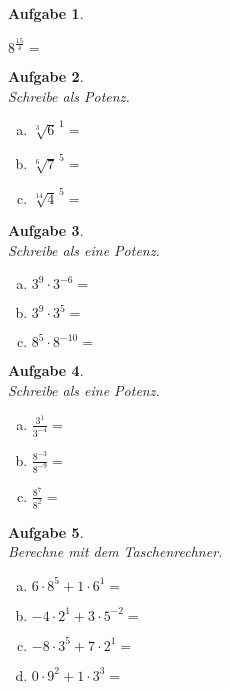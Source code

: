 \documentclass[12pt,fleqn]{article}
\theoremstyle{aufg}
\newtheorem{aufgabe}{Aufgabe}
\theoremstyle{bsp}
\begin{document}
\begin{flushleft}
\begin{aufgabe}
\begin{multicols}{3}
\begin{enumerate}[a)]
$8^{\frac{15}{4}}=$
\end{enumerate} 
\end{multicols} 
\end{aufgabe} 
\begin{aufgabe} ~ \\ 
Schreibe als Potenz. \\ 
\begin{multicols}{3} 
\begin{enumerate}[a)] 
\item 
$\sqrt[3]{6}^{\,1}=$
\item 
$\sqrt[6]{7}^{\,5}=$
\item 
$\sqrt[14]{4}^{\,5}=$
\end{enumerate} 
\end{multicols} 
\end{aufgabe} 
\begin{aufgabe} ~ \\ 
Schreibe als eine Potenz. \\ 
\begin{multicols}{3} 
\begin{enumerate}[a)] 
\item 
$3^{9}\cdot3^{-6}=$
\item 
$3^{9}\cdot3^{5}=$
\item 
$8^{5}\cdot8^{-10}=$
\end{enumerate} 
\end{multicols} 
\end{aufgabe} 
\begin{aufgabe} ~ \\ 
Schreibe als eine Potenz. \\ 
\begin{multicols}{3} 
\begin{enumerate}[a)] 
\item 
$\frac{3^{1}}{3^{-4}}=$
\item 
$\frac{8^{-3}}{8^{-9}}=$
\item 
$\frac{8^{7}}{8^{2}}=$
\end{enumerate} 
\end{multicols} 
\end{aufgabe} 
\begin{aufgabe} ~ \\ 
Berechne mit dem Taschenrechner. \\ 
\begin{multicols}{2} 
\begin{enumerate}[a)] 
\item 
$6\cdot8^{5}+1\cdot6^{1}=$
\item 
$-4\cdot2^{1}+3\cdot5^{-2}=$
\item 
$-8\cdot3^{5}+7\cdot2^{1}=$
\item 
$0\cdot9^{2}+1\cdot3^{3}=$
\end{enumerate} 
\end{multicols} 
\end{aufgabe} 
\end{flushleft} 
\end{document}
